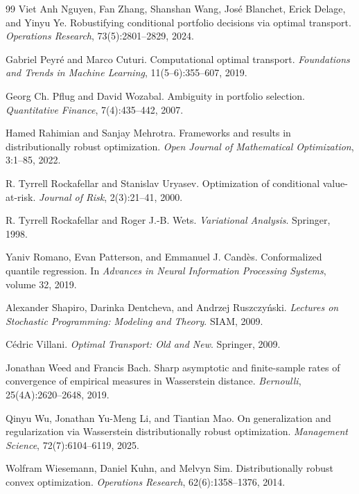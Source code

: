 \documentclass[11pt]{article}
\newcommand{\1}{\mathbf{1}}
\begin{document}
\begin{thebibliography}{99}
Viet Anh Nguyen, Fan Zhang, Shanshan Wang, Jos\'e Blanchet, Erick Delage, and Yinyu Ye.
\newblock Robustifying conditional portfolio decisions via optimal transport.\\
\newblock \emph{Operations Research}, 73(5):2801--2829, 2024.

Gabriel Peyr\'e and Marco Cuturi.
\newblock Computational optimal transport.
\newblock \emph{Foundations and Trends in Machine Learning}, 11(5--6):355--607, 2019.

Georg Ch. Pflug and David Wozabal.
\newblock Ambiguity in portfolio selection.
\newblock \emph{Quantitative Finance}, 7(4):435--442, 2007.

Hamed Rahimian and Sanjay Mehrotra.
\newblock Frameworks and results in distributionally robust optimization.
\newblock \emph{Open Journal of Mathematical Optimization}, 3:1--85, 2022.

R. Tyrrell Rockafellar and Stanislav Uryasev.
\newblock Optimization of conditional value-at-risk.
\newblock \emph{Journal of Risk}, 2(3):21--41, 2000.

R. Tyrrell Rockafellar and Roger J.-B. Wets.
\newblock \emph{Variational Analysis}.
\newblock Springer, 1998.

Yaniv Romano, Evan Patterson, and Emmanuel J. Cand\`es.
\newblock Conformalized quantile regression.
\newblock In \emph{Advances in Neural Information Processing Systems}, volume 32, 2019.

Alexander Shapiro, Darinka Dentcheva, and Andrzej Ruszczy\'nski.
\newblock \emph{Lectures on Stochastic Programming: Modeling and Theory}.
\newblock SIAM, 2009.

C\'edric Villani.
\newblock \emph{Optimal Transport: Old and New}.
\newblock Springer, 2009.

Jonathan Weed and Francis Bach.
\newblock Sharp asymptotic and finite-sample rates of convergence of empirical measures in Wasserstein distance.
\newblock \emph{Bernoulli}, 25(4A):2620--2648, 2019.

Qinyu Wu, Jonathan Yu-Meng Li, and Tiantian Mao.
\newblock On generalization and regularization via Wasserstein distributionally robust optimization.
\newblock \emph{Management Science}, 72(7):6104--6119, 2025.

Wolfram Wiesemann, Daniel Kuhn, and Melvyn Sim.
\newblock Distributionally robust convex optimization.
\newblock \emph{Operations Research}, 62(6):1358--1376, 2014.

\end{thebibliography}
\endgroup
\end{document}
